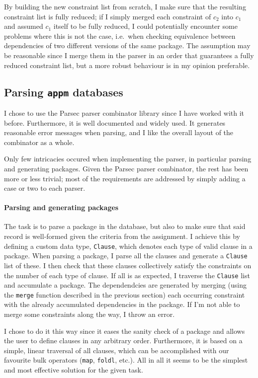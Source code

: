  By building the new constraint list from scratch, I make sure that the resulting constraint list is fully reduced; if I simply merged each constraint of $c_2$ into $c_1$ and assumed $c_1$ itself to be fully reduced, I could potentially encounter some problems where this is not the case, i.e.\ when checking equivalence between dependencies of two different versions of the same package. The assumption may be reasonable since I merge them in the parser in an order that guarantees a fully reduced constraint list, but a more robust behaviour is in my opinion preferable.

\subsection*{Parsing \texttt{appm} databases}
I chose to use the Parsec parser combinator library since I have worked with it before. Furthermore, it is well documented and widely used. It generates reasonable error messages when parsing, and I like the overall layout of the combinator as a whole.

Only few intricacies occured when implementing the parser, in particular parsing and generating packages. Given the Parsec parser combinator, the rest has been more or less trivial; most of the requirements are addressed by simply adding a case or two to each parser.

\paragraph{Parsing and generating packages} The task is to parse a package in the database, but also to make sure that said record is well-formed given the criteria from the assignment. I achieve this by defining a custom data type, \texttt{Clause}, which denotes each type of valid clause in a package. When parsing a package, I parse all the clauses and generate a \texttt{Clause} list of these. I then check that these clauses collectively satisfy the constraints on the number of each type of clause. If all is as expected, I traverse the \texttt{Clause} list and accumulate a package. The dependendcies are generated by merging (using the \texttt{merge} function described in the previous section) each occurring constraint with the already accumulated dependencies in the package. If I'm not able to merge some constraints along the way, I throw an error.

I chose to do it this way since it eases the sanity check of a package and allows the user to define clauses in any arbitrary order. Furthermore, it is based on a simple, linear traversal of all clauses, which can be accomplished with our favourite bulk operators (\texttt{map}, \texttt{foldl}, etc.). All in all it seems to be the simplest and most effective solution for the given task.

